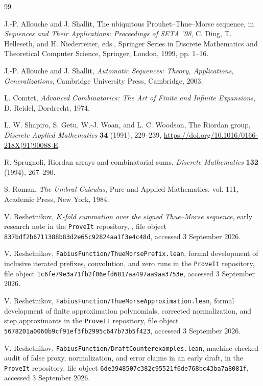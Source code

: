 \documentclass[11pt,oneside]{article}
\theoremstyle{definition}
\theoremstyle{remark}
\begin{document}
\begin{thebibliography}{99}

J.-P. Allouche and J. Shallit,
\newblock The ubiquitous Prouhet--Thue--Morse sequence,
\newblock in \emph{Sequences and Their Applications: Proceedings of SETA '98},
C. Ding, T. Helleseth, and H. Niederreiter, eds.,
Springer Series in Discrete Mathematics and Theoretical Computer Science,
Springer, London, 1999, pp. 1--16.

J.-P. Allouche and J. Shallit,
\newblock \emph{Automatic Sequences: Theory, Applications, Generalizations},
\newblock Cambridge University Press, Cambridge, 2003.

L. Comtet,
\newblock \emph{Advanced Combinatorics: The Art of Finite and Infinite
Expansions},
\newblock D. Reidel, Dordrecht, 1974.

L. W. Shapiro, S. Getu, W.-J. Woan, and L. C. Woodson,
\newblock The Riordan group,
\newblock \emph{Discrete Applied Mathematics} \textbf{34} (1991), 229--239,
\newblock \url{https://doi.org/10.1016/0166-218X(91)90088-E}.

R. Sprugnoli,
\newblock Riordan arrays and combinatorial sums,
\newblock \emph{Discrete Mathematics} \textbf{132} (1994), 267--290.

S. Roman,
\newblock \emph{The Umbral Calculus},
\newblock Pure and Applied Mathematics, vol. 111, Academic Press, New York,
1984.

V. Reshetnikov,
\newblock \emph{$K$-fold summation over the signed Thue--Morse sequence},
\newblock early research note in the \texttt{ProveIt} repository,
,
file object \texttt{837bdf2b6711388b83d2e65c92824aa1f3e4c48d},
accessed 3 September 2026.

V. Reshetnikov,
\newblock \texttt{FabiusFunction/ThueMorsePrefix.lean},
\newblock formal development of inclusive iterated prefixes, convolution, and
zero runs in the \texttt{ProveIt} repository,
file object \texttt{1c6fe79e3a71fb2f06efd6817aa497aa9aa3753e},
accessed 3 September 2026.

V. Reshetnikov,
\newblock \texttt{FabiusFunction/ThueMorseApproximation.lean},
\newblock formal development of finite approximation polynomials, corrected
normalization, and step approximants in the \texttt{ProveIt} repository,
file object \texttt{5678201a0060b9cf91ef3fb2995c647b73b5f423},
accessed 3 September 2026.

V. Reshetnikov,
\newblock \texttt{FabiusFunction/DraftCounterexamples.lean},
\newblock machine-checked audit of false proxy, normalization, and error
claims in an early draft, in the \texttt{ProveIt} repository,
file object \texttt{6de3948507c382c95521f6de768bc43ba7a8081f},
accessed 3 September 2026.

\end{thebibliography}
\end{document}
